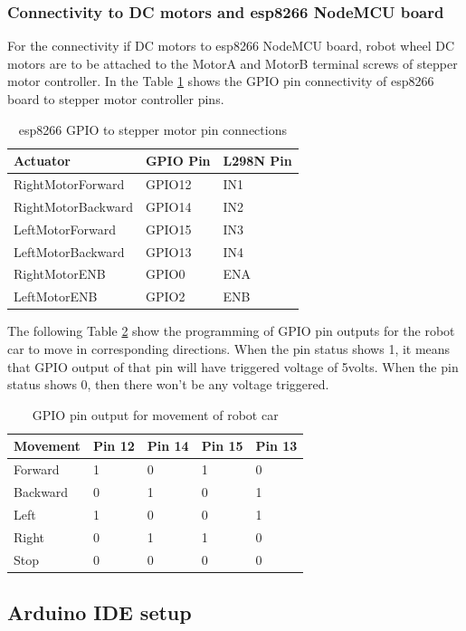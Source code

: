 \documentclass[sigconf]{acmart}
\begin{document}
\subsubsection{Connectivity to DC motors and esp8266 NodeMCU board}
For the connectivity if DC motors to esp8266 NodeMCU board, robot wheel DC motors are to be attached to the MotorA and MotorB terminal screws of stepper motor controller. In the Table \ref{T:pinlayout} shows the GPIO pin connectivity of esp8266 board to stepper motor controller pins.


\begin{table}[htb]
\caption{esp8266 GPIO to stepper motor pin connections}\label{T:pinlayout}
\begin{tabular}{lll}
Actuator & GPIO Pin & L298N Pin \\
\hline
    RightMotorForward & GPIO12 & IN1 \\
    RightMotorBackward & GPIO14 & IN2 \\
    LeftMotorForward & GPIO15 & IN3 \\
    LeftMotorBackward & GPIO13 & IN4 \\
    RightMotorENB & GPIO0 & ENA \\
    LeftMotorENB & GPIO2 & ENB \\
\end{tabular}
\end{table}

The following Table \ref{T:gpiooutput} show the programming of GPIO pin outputs for the robot car to move in corresponding directions. When the pin status shows 1, it means that GPIO output of that pin will have triggered voltage of 5volts. When the pin status shows 0, then there won't be any voltage triggered.

\begin{table}[htb]
\caption{GPIO pin output for movement of robot car}\label{T:gpiooutput}
\begin{tabular}{lllll}
Movement & Pin 12 & Pin 14 & Pin 15 & Pin 13 \\
\hline
Forward & 1 & 0 & 1 & 0 \\ 
Backward & 0 & 1 & 0 & 1 \\
Left & 1 & 0 & 0 & 1 \\
Right & 0 & 1 & 1 & 0 \\
Stop  & 0 & 0 & 0 & 0 \\
\end{tabular}
\end{table}

\subsection{Arduino IDE setup}
\end{document}
